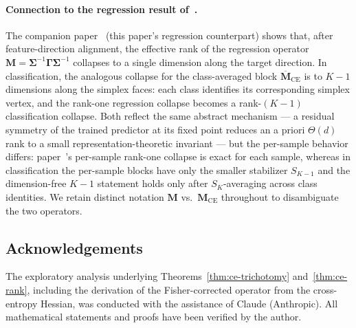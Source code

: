 \documentclass[12pt]{amsart}
\theoremstyle{definition}
\theoremstyle{remark}
\newcommand{\bM}{\mathbf{M}}
\newcommand{\bSigma}{\boldsymbol{\Sigma}}
\newcommand{\bGamma}{\boldsymbol{\Gamma}}
\begin{document}
\paragraph{Connection to the regression result of~\cite{paperC}.}
The companion paper~\cite{paperC} (this paper's regression
counterpart) shows that, after feature-direction alignment, the
effective rank of the regression operator
$\bM = \bSigma^{-1}\bGamma\bSigma^{-1}$ collapses to a single
dimension along the target direction. In classification, the
analogous collapse for the class-averaged block
$\overline{\bM}_{\mathrm{CE}}$ is to $K-1$ dimensions along the
simplex faces: each class identifies its corresponding simplex
vertex, and the rank-one regression collapse becomes a
rank-$(K-1)$ classification collapse. Both reflect the same
abstract mechanism --- a residual symmetry of the trained
predictor at its fixed point reduces an a priori $\Theta(d)$ rank
to a small representation-theoretic invariant --- but the per-sample
behavior differs: paper~\cite{paperC}'s per-sample rank-one
collapse is exact for each sample, whereas in classification the
per-sample blocks have only the smaller stabilizer $S_{K-1}$ and
the dimension-free $K-1$ statement holds only after $S_{K}$-averaging
across class identities. We retain distinct notation
$\bM$ vs.\ $\bM_{\mathrm{CE}}$ throughout to disambiguate the two
operators.

\subsection*{Acknowledgements}

The exploratory analysis underlying Theorems~\ref{thm:ce-trichotomy}
and~\ref{thm:ce-rank}, including the derivation of the
Fisher-corrected operator from the cross-entropy Hessian, was
conducted with the assistance of Claude (Anthropic). All
mathematical statements and proofs have been verified by the
author.

\end{document}
